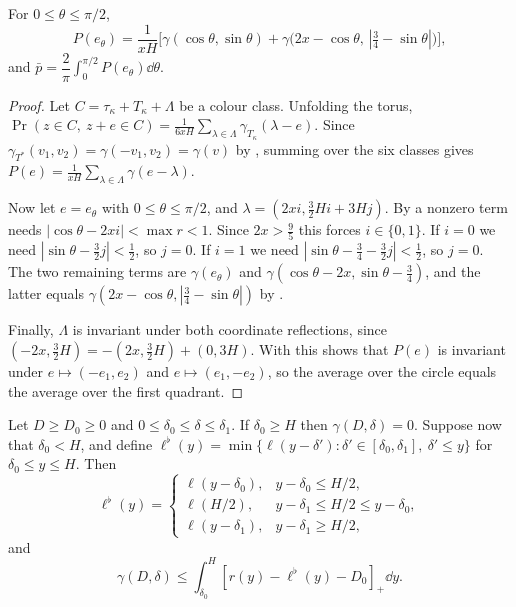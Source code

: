 \documentclass[11pt,colorlinks]{charlie}
\newcommand{\pos}[1]{\left[#1\right]_+}
\begin{document}
\begin{lemma}\label{lem:mono}
For $0\le\theta\le\pi/2$,
\[
 P(e_\theta)=\frac{1}{xH}\Big[\gamma(\cos\theta,\sin\theta)+\gamma\big(2x-\cos\theta,\,|\tfrac34-\sin\theta|\big)\Big],
\]
and $\bar p=\dfrac{2}{\pi}\displaystyle\int_0^{\pi/2}P(e_\theta)\dd\theta$.
\end{lemma}

\begin{proof}
Let $C=\tau_\kappa+T_\kappa+\Lambda$ be a colour class. Unfolding the torus, $\Pr(z\in C,\ z+e\in C)=\frac{1}{6xH}\sum_{\lambda\in\Lambda}\gamma_{T_\kappa}(\lambda-e)$. Since $\gamma_{T^*}(v_1,v_2)=\gamma(-v_1,v_2)=\gamma(v)$ by , summing over the six classes gives $P(e)=\frac{1}{xH}\sum_{\lambda\in\Lambda}\gamma(e-\lambda)$.

Now let $e=e_\theta$ with $0\le\theta\le\pi/2$, and $\lambda=(2xi,\tfrac32Hi+3Hj)$. By  a nonzero term needs $|\cos\theta-2xi|<\max r<1$. Since $2x>\tfrac95$ this forces $i\in\{0,1\}$. If $i=0$ we need $|\sin\theta-\tfrac32j|<\tfrac12$, so $j=0$. If $i=1$ we need $|\sin\theta-\tfrac34-\tfrac32j|<\tfrac12$, so $j=0$. The two remaining terms are $\gamma(e_\theta)$ and $\gamma(\cos\theta-2x,\sin\theta-\tfrac34)$, and the latter equals $\gamma(2x-\cos\theta,|\tfrac34-\sin\theta|)$ by .

Finally, $\Lambda$ is invariant under both coordinate reflections, since $(-2x,\tfrac32H)=-(2x,\tfrac32H)+(0,3H)$. With  this shows that $P(e)$ is invariant under $e\mapsto(-e_1,e_2)$ and $e\mapsto(e_1,-e_2)$, so the average over the circle equals the average over the first quadrant.
\end{proof}

\begin{lemma}\label{lem:enclosure}
Let $D\ge D_0\ge0$ and $0\le\delta_0\le\delta\le\delta_1$. If $\delta_0\ge H$ then $\gamma(D,\delta)=0$. Suppose now that $\delta_0<H$, and define $\ell^\flat(y)=\min\{\ell(y-\delta'):\delta'\in[\delta_0,\delta_1],\ \delta'\le y\}$ for $\delta_0\le y\le H$. Then
\begin{equation}\label{eq:lflat}
 \ell^\flat(y)=\begin{cases}\ell(y-\delta_0),& y-\delta_0\le H/2,\\ \ell(H/2),& y-\delta_1\le H/2\le y-\delta_0,\\ \ell(y-\delta_1),& y-\delta_1\ge H/2,\end{cases}
\end{equation}
and
\[
 \gamma(D,\delta)\le\int_{\delta_0}^{H}\pos{r(y)-\ell^\flat(y)-D_0}\dd y .
\]
\end{lemma}
\end{document}
